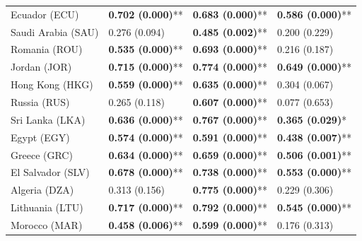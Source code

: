 \begin{longtable}{p{5cm}p{3cm}p{3cm}p{5cm}}
Ecuador (ECU) & \textcolor{atlLime600}{\textbf{0.702 (0.000)}**} & \textcolor{atlLime600}{\textbf{0.683 (0.000)}**} & \textcolor{atlLime600}{\textbf{0.586 (0.000)}**} \\
Saudi Arabia (SAU) & \textcolor{atlOrange600}{0.276 (0.094)} & \textcolor{atlLime600}{\textbf{0.485 (0.002)}**} & \textcolor{atlOrange600}{0.200 (0.229)} \\
Romania (ROU) & \textcolor{atlLime600}{\textbf{0.535 (0.000)}**} & \textcolor{atlLime600}{\textbf{0.693 (0.000)}**} & \textcolor{atlOrange600}{0.216 (0.187)} \\
Jordan (JOR) & \textcolor{atlLime600}{\textbf{0.715 (0.000)}**} & \textcolor{atlLime600}{\textbf{0.774 (0.000)}**} & \textcolor{atlLime600}{\textbf{0.649 (0.000)}**} \\
Hong Kong (HKG) & \textcolor{atlLime600}{\textbf{0.559 (0.000)}**} & \textcolor{atlLime600}{\textbf{0.635 (0.000)}**} & \textcolor{atlOrange600}{0.304 (0.067)} \\
Russia (RUS) & \textcolor{atlOrange600}{0.265 (0.118)} & \textcolor{atlLime600}{\textbf{0.607 (0.000)}**} & \textcolor{atlOrange600}{0.077 (0.653)} \\
Sri Lanka (LKA) & \textcolor{atlLime600}{\textbf{0.636 (0.000)}**} & \textcolor{atlLime600}{\textbf{0.767 (0.000)}**} & \textcolor{atlLime600}{\textbf{0.365 (0.029)}*} \\
Egypt (EGY) & \textcolor{atlLime600}{\textbf{0.574 (0.000)}**} & \textcolor{atlLime600}{\textbf{0.591 (0.000)}**} & \textcolor{atlLime600}{\textbf{0.438 (0.007)}**} \\
Greece (GRC) & \textcolor{atlLime600}{\textbf{0.634 (0.000)}**} & \textcolor{atlLime600}{\textbf{0.659 (0.000)}**} & \textcolor{atlLime600}{\textbf{0.506 (0.001)}**} \\
El Salvador (SLV) & \textcolor{atlLime600}{\textbf{0.678 (0.000)}**} & \textcolor{atlLime600}{\textbf{0.738 (0.000)}**} & \textcolor{atlLime600}{\textbf{0.553 (0.000)}**} \\
Algeria (DZA) & \textcolor{atlOrange600}{0.313 (0.156)} & \textcolor{atlLime600}{\textbf{0.775 (0.000)}**} & \textcolor{atlOrange600}{0.229 (0.306)} \\
Lithuania (LTU) & \textcolor{atlLime600}{\textbf{0.717 (0.000)}**} & \textcolor{atlLime600}{\textbf{0.792 (0.000)}**} & \textcolor{atlLime600}{\textbf{0.545 (0.000)}**} \\
Morocco (MAR) & \textcolor{atlLime600}{\textbf{0.458 (0.006)}**} & \textcolor{atlLime600}{\textbf{0.599 (0.000)}**} & \textcolor{atlOrange600}{0.176 (0.313)} \\

\end{longtable}
